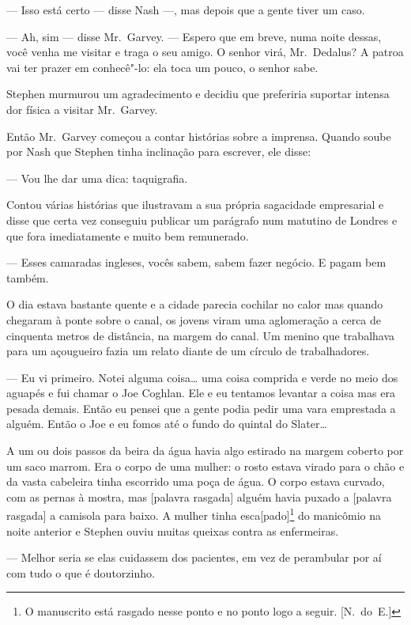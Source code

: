 --- Isso está certo --- disse Nash ---, mas depois que a gente
tiver um caso.

--- Ah, sim --- disse Mr.~Garvey.  --- Espero que em breve, numa
noite dessas, você venha me visitar e traga o seu amigo.  O senhor
virá, Mr.~Dedalus?  A patroa vai ter prazer em conhecê"-lo: ela toca um
pouco, o senhor sabe.

Stephen murmurou um agradecimento e decidiu que preferiria suportar
intensa dor física a visitar Mr.~Garvey.

Então Mr.~Garvey começou a contar histórias sobre a imprensa. 
Quando soube por Nash que Stephen tinha inclinação para escrever, ele
disse:

--- Vou lhe dar uma dica: taquigrafia.

Contou várias histórias que ilustravam a sua própria sagacidade
empresarial e disse que certa vez conseguiu publicar um parágrafo num
matutino de Londres e que fora imediatamente e muito bem remunerado.

--- Esses camaradas ingleses, vocês sabem, sabem fazer negócio. 
E pagam bem também.

O dia estava bastante quente e a cidade parecia cochilar no calor
mas quando chegaram à ponte sobre o canal, os jovens viram uma
aglomeração a cerca de cinquenta metros de distância, na margem do
canal.  Um menino que trabalhava para um açougueiro fazia um relato
diante de um círculo de trabalhadores.

--- Eu vi primeiro.  Notei alguma coisa\ldots{} uma coisa comprida e
verde no meio dos aguapés e fui chamar o Joe Coghlan.  Ele e eu
tentamos levantar a coisa mas era pesada demais.  Então eu pensei que a
gente podia pedir uma vara emprestada a alguém.  Então o Joe e eu fomos
até o fundo do quintal do Slater\ldots{}

A um ou dois passos da beira da água havia algo estirado na margem
coberto por um saco marrom.  Era o corpo de uma mulher: o rosto estava
virado para o chão e da vasta cabeleira tinha escorrido uma poça de
água.  O corpo estava curvado, com as pernas à mostra, mas [palavra
rasgada] alguém havia puxado a [palavra rasgada] a camisola para baixo.
 A mulher tinha esca[pado]\footnote{ O manuscrito está rasgado nesse
ponto e no ponto logo a seguir. [N.~do~E.]} do manicômio na noite
anterior e Stephen ouviu muitas queixas contra as enfermeiras.

--- Melhor seria se elas cuidassem dos pacientes, em vez de
perambular por aí com tudo o que é doutorzinho.

